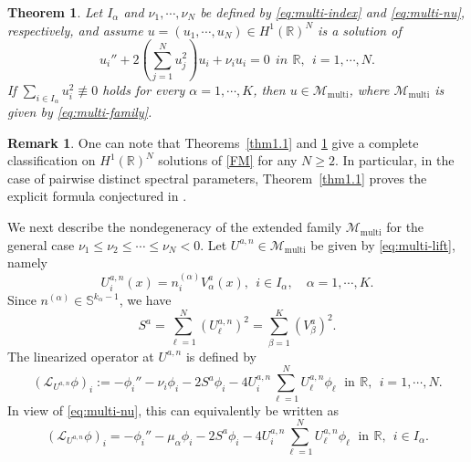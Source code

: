 \documentclass[11pt]{article}
\numberwithin{equation}{section}
\newtheorem{theorem}{Theorem}[section]
\newcommand{\R}{{\mathbb{R}}}
\theoremstyle{definition}
\newtheorem{remark}{Remark}[section]
\begin{document}
\begin{theorem}
\label{thm:completeness-multiple-root}
Let $I_\alpha$ and $\nu_1,\cdots,\nu_N$ be defined by \eqref{eq:multi-index} and \eqref{eq:multi-nu},  respectively, and assume $
u=(u_1,\cdots,u_N)\in H^1(\mathbb R)^N$
is a solution of
\begin{equation}\label{eq:multi-system}
	u_i''
	+2\left(\sum_{j=1}^N u_j^2\right)u_i
	+\nu_i u_i=0\ \ in \,\ \R,
	\ \  i=1,\cdots,N.
\end{equation}
If \(\sum_{i\in I_\alpha}u_i^2\not\equiv0\) holds for every
\(\alpha=1,\cdots,K\), then \(u\in\mathcal M_{\mathrm{multi}}\), where
\(\mathcal M_{\mathrm{multi}}\) is given by \eqref{eq:multi-family}.
\end{theorem}



\begin{remark}\label{rem:conj51}
One can note that Theorems~\ref{thm1.1} and
\ref{thm:completeness-multiple-root} give a complete classification
on \(H^1(\mathbb R)^N\) solutions of \eqref{FM} for any
\(N\ge2\). In particular, in the case of pairwise distinct spectral
parameters, Theorem~\ref{thm1.1} proves the explicit formula conjectured in
\cite[Conjecture~5.1]{GLW2026}.
\end{remark}



We next describe the nondegeneracy of the extended family
$\mathcal M_{\mathrm{multi}}$ for the general case  $\nu_1\le\nu_2\le\cdots \le\nu_N<0$. Let
$U^{a,n}\in\mathcal M_{\mathrm{multi}}$
be given by \eqref{eq:multi-lift}, namely
\begin{equation}\label{eq:multi-U}
U^{a,n}_i(x)=n_i^{(\alpha)}V_\alpha^a(x),
\ \
i\in I_\alpha,\quad \alpha=1,\cdots,K.
\end{equation}
Since $n^{(\alpha)}\in \mathbb S^{k_\alpha-1}$, we have
\begin{equation}\label{eq:mul-S}
S^{a}=\sum_{\ell=1}^N (U^{a,n}_\ell)^2
=
\sum_{\beta=1}^K (V_\beta^a)^2 .
\end{equation}
The linearized operator at $U^{a,n}$ is  defined by
\begin{equation}\label{eq:multi-LU}
(\mathcal L_{U^{a,n}}\phi)_i
:=
-\phi_i''
-\nu_i\phi_i
-2S^{a}\phi_i
-4U^{a,n}_i\sum_{\ell=1}^N U^{a,n}_\ell\phi_\ell\ \ \,\mbox{in} \,\ \R,
\ \  i=1,\cdots,N.
\end{equation}
In view of \eqref{eq:multi-nu}, this can equivalently be written as
\begin{equation}\label{eq:multi-LU-block}
(\mathcal L_{U^{a,n}}\phi)_i
=
-\phi_i''
-\mu_\alpha\phi_i
-2S^{a}\phi_i
-4U^{a,n}_i\sum_{\ell=1}^N U^{a,n}_\ell\phi_\ell\ \ \,\mbox{in} \,\ \R,
\ \  i\in I_\alpha .
\end{equation}
\end{document}
